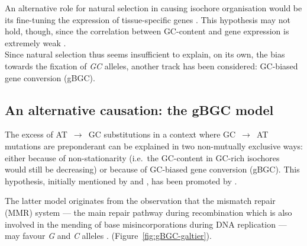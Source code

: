An alternative role for natural selection in causing isochore organisation would be its fine-tuning the expression of tissue-specific genes \citep{vinogradov2003isochores,vinogradov2005noncoding}.
This hypothesis may not hold, though, since the correlation between GC-content and gene expression is extremely weak \citep[reviewed in \citealp{duret2009biased}]{semon2005relationship,semon2006no,pouyet2017recombination}.\\


Since natural selection thus seems insufficient to explain, on its own, the bias towards the fixation of \textit{GC} alleles, another track has been considered: GC-biased gene conversion (gBGC).





\subsection{An alternative causation: the gBGC model}

The excess of AT~$\rightarrow$~GC substitutions in a context where GC~$\rightarrow$~AT mutations are preponderant can be explained in two non-mutually exclusive ways: either because of non-stationarity (i.e.\ the GC-content in GC-rich isochores would still be decreasing) or because of GC-biased gene conversion (gBGC).
This hypothesis, initially mentioned by \citet{holmquist1992chromosome} and \citet{eyre-walker1993recombination,eyre-walker1999evidence}, has been promoted by \citet{galtier2001gccontent}.

The latter model originates from the observation that the mismatch repair (MMR) system — the main repair pathway during recombination \citep[reviewed in \citealp{evans2000roles} and \citealp{spies2015mismatch}]{alani1994interaction,nicolas1994polarity} which is also involved in the mending of base misincorporations during DNA replication \citep{surtees2004mismatch} — may favour \textit{G} and \textit{C} alleles \citep{brown1988different,bill1998efficient}. (Figure~\ref{fig:gBGC-galtier}). \\


